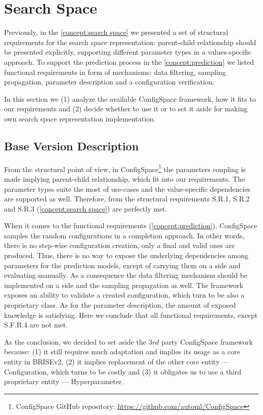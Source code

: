 \section{Search Space}\label{impl: search space}
Previously, in the \cref{concept:search space} we presented a set of structural requirements for the search space representation: parent-child relationship should be presented explicitly, supporting different parameter types in a values-specific approach. To support the prediction process in the \cref{concept:prediction} we listed functional requirements in form of mechanisms: data filtering, sampling propagation, parameter description and a configuration verification.

In this section we (1) analyze the available ConfigSpace framework, how it fits to our requirements and (2) decide whether to use it or to set it aside for making own search space representation implementation.

\subsection{Base Version Description}
From the structural point of view, in ConfigSpace\footnote{ConfigSpace GitHub repository: \url{https://github.com/automl/ConfigSpace}} the parameters coupling is made implying parent-child relationship, which fit into our requirements. The parameter types suite the most of use-cases and the value-specific dependencies are supported as well. Therefore, from the structural requirements S.R.1, S.R.2 and S.R.3 (\cref{concept:search space}) are perfectly met.

When it comes to the functional requirements (\cref{concept:prediction}), ConfigSpace samples the random configurations in a completion approach. In other words, there is no step-wise configuration creation, only a final and valid ones are produced. Thus, there is no way to expose the underlying dependencies among parameters for the prediction models, except of carrying them on a side and evaluating manually. As a consequence the data filtering mechanism should be implemented on a side and the sampling propagation as well. The framework exposes an ability to validate a created configuration, which turn to be also a proprietary class. As for the parameter description, the amount of exposed knowledge is satisfying. Here we conclude that all functional requirements, except S.F.R.4 are not met.

As the conclusion, we decided to set aside the $3rd$ party ConfigSpace framework because: (1) it still requires much adaptation and implies its usage as a core entity in BRISEv2, (2) it implies replacement of the other core entity — Configuration, which turns to be costly and (3) it obligates us to use a third proprietary entity — Hyperparameter. 

